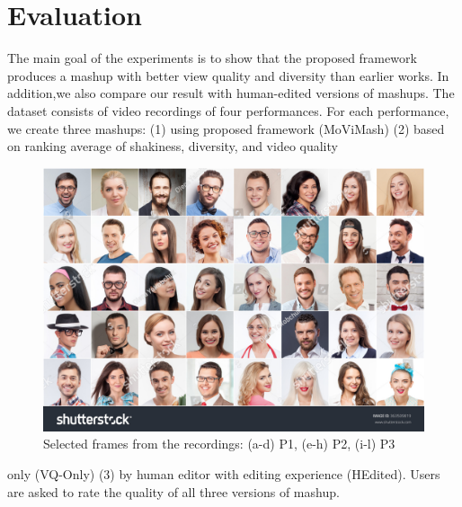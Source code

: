 \documentclass{sig-alternate}
\begin{document}
\section{Evaluation}
The main goal of the experiments is to show that the proposed framework produces a mashup with better view quality and diversity than earlier works. In addition,we also compare our result with human-edited versions of mashups. The dataset consists of video recordings of four performances. For each performance, we create three mashups: (1) using proposed framework (MoViMash) (2) based on ranking average of shakiness, diversity, and video quality


\begin{figure}[h!]
    \centering
    \includegraphics{6.jpg}
    \caption{Selected frames from the recordings: (a-d) P1, (e-h) P2, (i-l) P3}
    \label{fig: 6}
\end{figure}

only (VQ-Only) (3) by human editor with editing experience (HEdited).
Users are asked to rate the quality of all three versions of
mashup.
\end{document}
